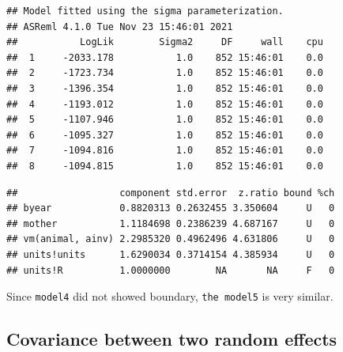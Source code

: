 \documentclass[
  12pt,
]{book}
\newenvironment{Shaded}{\begin{snugshade}}{\end{snugshade}}
\newcommand{\KeywordTok}[1]{\textcolor[rgb]{0.13,0.29,0.53}{\textbf{#1}}}
\newcommand{\NormalTok}[1]{#1}
\newcommand{\OperatorTok}[1]{\textcolor[rgb]{0.81,0.36,0.00}{\textbf{#1}}}
\begin{document}
\begin{verbatim}
## Model fitted using the sigma parameterization.
## ASReml 4.1.0 Tue Nov 23 15:46:01 2021
##           LogLik        Sigma2     DF     wall    cpu
##  1     -2033.178           1.0    852 15:46:01    0.0
##  2     -1723.734           1.0    852 15:46:01    0.0
##  3     -1396.354           1.0    852 15:46:01    0.0
##  4     -1193.012           1.0    852 15:46:01    0.0
##  5     -1107.946           1.0    852 15:46:01    0.0
##  6     -1095.327           1.0    852 15:46:01    0.0
##  7     -1094.816           1.0    852 15:46:01    0.0
##  8     -1094.815           1.0    852 15:46:01    0.0
\end{verbatim}

\begin{Shaded}
\end{Shaded}

\begin{verbatim}
##                  component std.error  z.ratio bound %ch
## byear            0.8820313 0.2632455 3.350604     U   0
## mother           1.1184698 0.2386239 4.687167     U   0
## vm(animal, ainv) 2.2985320 0.4962496 4.631806     U   0
## units!units      1.6290034 0.3714154 4.385934     U   0
## units!R          1.0000000        NA       NA     F   0
\end{verbatim}

Since \texttt{model4} did not showed boundary, \texttt{the\ model5} is very similar.

\hypertarget{covariance-between-two-random-effects}{%
\subsection{Covariance between two random effects}\label{covariance-between-two-random-effects}}
\end{document}
